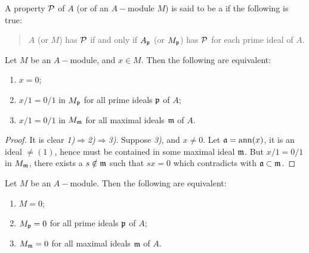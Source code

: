   \begin{defn}
    A property ${\cal P}$ of $A$ (or of an $A-$module $M$) is said to be a  if the following is true:
    \begin{quote}
      $A$ (or $M$) has ${\cal P}$ if and only if $A_{\mathfrak{p}}$ (or $M_{\mathfrak{p}}$) has ${\cal P}$ for each prime ideal of $A$.
    \end{quote}
  \end{defn}

  \begin{prop}\label{L.P.1}
    Let $M$ be an $A-$module, and $x\in M$. Then the following are equivalent:
    \begin{enumerate}
      \item $x=0$;
      \item $x/1=0/1$ in $M_{\mathfrak{p}}$ for all prime ideals $\mathfrak{p}$ of $A$;
      \item $x/1=0/1$ in $M_{\mathfrak{m}}$ for all maximal ideals $\mathfrak{m}$ of $A$.
    \end{enumerate}
  \end{prop}
  \begin{proof}
    It is clear \emph{1)$\Rightarrow$2)$\Rightarrow$3)}. Suppose \emph{3)}, and $x\neq0$. Let $\mathfrak{a}=\operatorname{ann}(x)$, it is an ideal $\neq(1)$, hence must be contained in some maximal ideal $\mathfrak{m}$. But $x/1=0/1$ in $M_{\mathfrak{m}}$, there exists a $s\notin\mathfrak{m}$ such that $sx=0$ which contradicts with $\mathfrak{a}\subset\mathfrak{m}$.
  \end{proof}
  \begin{cor}\label{L.P.1.1}
    Let $M$ be an $A-$module. Then the following are equivalent:
    \begin{enumerate}
      \item $M=0$;
      \item $M_{\mathfrak{p}}=0$ for all prime ideals $\mathfrak{p}$ of $A$;
      \item $M_{\mathfrak{m}}=0$ for all maximal ideals $\mathfrak{m}$ of $A$.
    \end{enumerate}
  \end{cor}

